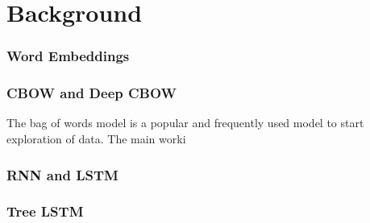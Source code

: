 \section{Background}
\label{sec: background}
\subsubsection{Word Embeddings}
\subsubsection{CBOW and Deep CBOW}
The bag of words model is a popular and frequently used model to start
exploration of data. The main worki
\subsubsection{RNN and LSTM}
\subsubsection{Tree LSTM}
